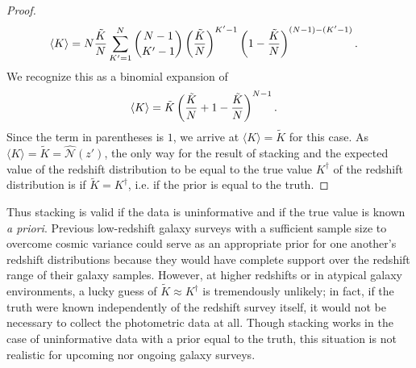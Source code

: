 \begin{proof}
\begin{align}
	\eqlabel{eqn:proofwithprior4}
	    \langle K \rangle &= N \frac{\tilde{K}}{N} \sum_{K' = 1}^{N} \binom{N - 1}{K' - 1} \left(\frac{\tilde{K}}{N}\right)^{K' - 1} \left(1 - \frac{\tilde{K}}{N}\right)^{(N - 1) - (K' - 1)} .
	\end{align}
	We recognize this as a binomial expansion of
	\begin{align}
	\eqlabel{eqn:proofwithprior5}
	    \langle K \rangle &= \tilde{K} \left(\frac{\tilde{K}}{N} + 1 - \frac{\tilde{K}}{N}\right)^{N - 1} .
	\end{align}
	Since the term in parentheses is $1$, we arrive at ${\langle K \rangle = \tilde{K}}$ for this case.
	As $\langle K \rangle = \tilde{K} = \hat{\mathcal{N}}(z')$, the only way for the result of stacking and the expected value of the redshift distribution to be equal to the true value $K^{\dagger}$ of the redshift distribution is if $\tilde{K} = K^{\dagger}$, i.e. if the prior is equal to the truth.
\end{proof}

Thus stacking is valid if the data is uninformative and if the true value is known \textit{a priori}.
Previous low-redshift galaxy surveys with a sufficient sample size to overcome cosmic variance could serve as an appropriate prior for one another's redshift distributions because they would have complete support over the redshift range of their galaxy samples.
However, at higher redshifts or in atypical galaxy environments, a lucky guess of ${\tilde{K} \approx K^{\dagger}}$ is tremendously unlikely;
in fact, if the truth were known independently of the redshift survey itself, it would not be necessary to collect the photometric data at all.
Though stacking works in the case of uninformative data with a prior equal to the truth, this situation is not realistic for upcoming nor ongoing galaxy surveys.

